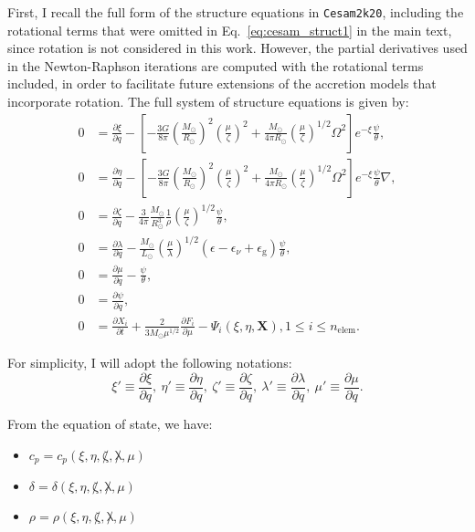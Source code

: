 \documentclass[12pt,a4paper]{article}
\newcommand{\mr}{\mathrm}
\newcommand{\pfird}[2][]{\frac{\partial#1}{\partial#2}}
\newcommand{\bvec}[1]{\boldsymbol{#1}}
\begin{document}
First, I recall the full form of the structure equations in \texttt{Cesam2k20}, including the rotational terms that were omitted in Eq.~\eqref{eq:cesam_struct1} in the main text, since rotation is not considered in this work. However, the partial derivatives used in the Newton-Raphson iterations are computed with the rotational terms included, in order to facilitate future extensions of the accretion models that incorporate rotation. The full system of structure equations is given by:
\begin{subequations} \label{eq:cesam2k20_struct_eq_full}
  \begin{align}
    0 &= \pfird[\xi]{q} - \left[-\frac{3G}{8\pi}\left(\frac{M_\odot}{R_\odot}\right)^2\left(\frac{\mu}{\zeta}\right)^2 + \frac{M_\odot}{4\pi R_\odot}\left(\frac{\mu}{\zeta}\right)^{1/2} \Omega^2\right]e^{-\xi}\frac{\psi}{\theta}, \label{eq:cesam_struct1_full}\\
    0 &= \pfird[\eta]{q} - \left[-\frac{3G}{8\pi}\left(\frac{M_\odot}{R_\odot}\right)^2\left(\frac{\mu}{\zeta}\right)^2 + \frac{M_\odot}{4\pi R_\odot}\left(\frac{\mu}{\zeta}\right)^{1/2} \Omega^2\right]e^{-\xi}\frac{\psi}{\theta}\nabla, \label{eq:cesam_struct2_full}\\
    0 &= \pfird[\zeta]{q} - \frac{3}{4\pi}\frac{M_\odot}{R_\odot^3}\frac{1}{\rho}\left(\frac{\mu}{\zeta}\right)^{1/2}\frac{\psi}{\theta}, \label{eq:cesam_struct3_full}\\
    0 &= \pfird[\lambda]{q} - \frac{M_\odot}{L_\odot}\left(\frac{\mu}{\lambda}\right)^{1/2}(\epsilon  - \epsilon_\nu + \epsilon_\mr{g})\frac{\psi}{\theta}, \label{eq:cesam_struct4_full}\\
    0 &= \pfird[\mu]{q} - \frac{\psi}{\theta}, \label{eq:cesam_struct5_full}\\
    0 &= \pfird[\psi]{q}, \label{eq:cesam_struct6_full}\\
    0 &= \pfird[X_i]{t} + \frac{2}{3 M_\odot\mu^{1/2}}\pfird[F_i]{\mu} - \Psi_i(\xi, \eta, \bvec{X}), 1\leq i \leq n_\mr{elem}. \label{eq:cesam_struct7_full}
  \end{align}
\end{subequations}

For simplicity, I will adopt the following notations:
\begin{equation}
  \xi' \equiv \pfird[\xi]{q},\ \eta' \equiv \pfird[\eta]{q},\ \zeta' \equiv \pfird[\zeta]{q},\ \lambda' \equiv \pfird[\lambda]{q},\ \mu' \equiv \pfird[\mu]{q}.
\end{equation}

From the equation of state, we have:
\begin{itemize}
  \item $c_p = c_p(\xi, \eta, \not\zeta, \not\lambda, \mu)$
  \item $\delta = \delta(\xi, \eta, \not\zeta, \not\lambda, \mu)$
  \item $\rho = \rho(\xi, \eta, \not\zeta, \not\lambda, \mu)$
\end{itemize}
\end{document}
